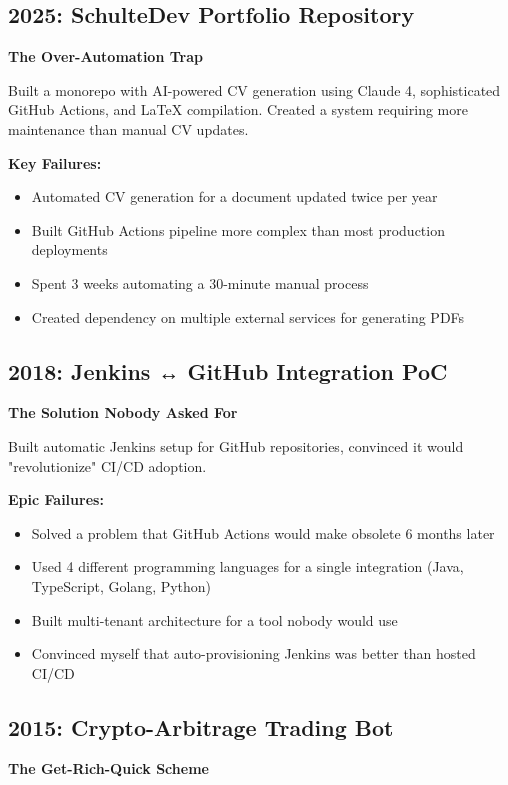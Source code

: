 \documentclass[10pt,a4paper]{article}
\begin{document}
\subsection{2025: SchulteDev Portfolio Repository}
\textbf{The Over-Automation Trap}

Built a monorepo with AI-powered CV generation using Claude 4, sophisticated GitHub Actions, and LaTeX compilation. Created a system requiring more maintenance than manual CV updates.

\textbf{Key Failures:}
\begin{itemize}[leftmargin=*,itemsep=1pt]
    \item Automated CV generation for a document updated twice per year
    \item Built GitHub Actions pipeline more complex than most production deployments
    \item Spent 3 weeks automating a 30-minute manual process
    \item Created dependency on multiple external services for generating PDFs
\end{itemize}

\subsection{2018: Jenkins ↔ GitHub Integration PoC}
\textbf{The Solution Nobody Asked For}

Built automatic Jenkins setup for GitHub repositories, convinced it would "revolutionize" CI/CD adoption.

\textbf{Epic Failures:}
\begin{itemize}[leftmargin=*,itemsep=1pt]
    \item Solved a problem that GitHub Actions would make obsolete 6 months later
    \item Used 4 different programming languages for a single integration (Java, TypeScript, Golang, Python)
    \item Built multi-tenant architecture for a tool nobody would use
    \item Convinced myself that auto-provisioning Jenkins was better than hosted CI/CD
\end{itemize}

\subsection{2015: Crypto-Arbitrage Trading Bot}
\textbf{The Get-Rich-Quick Scheme}
\end{document}
